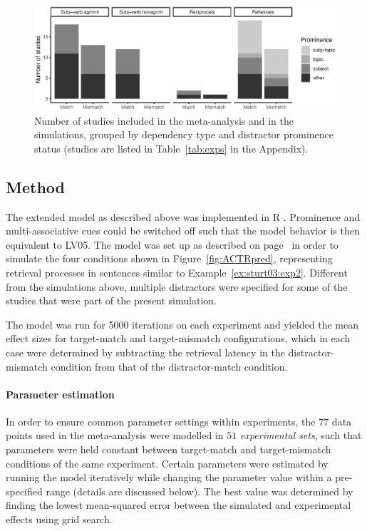 \documentclass{cambridge7A}\usepackage[]{graphicx}\usepackage[]{color}
\newenvironment{knitrout}{}{} %
\newcommand{\R}{\textsf{R}}
\begin{document}
\begin{figure}[htbp]
\centering
\begin{knitrout}
\color{fgcolor}

{\centering \includegraphics[width=\textwidth]{figures/fig-datsumfig-1} 

}



\end{knitrout}
\caption{Number of studies included in the \cite{JaegerEngelmannVasishth2017} meta-analysis and in the simulations, grouped by dependency type and distractor prominence status (studies are listed in Table~\ref{tab:exps} in the Appendix).}
\label{fig:datasummary}
\end{figure}

\subsection{Method}

The extended model as described above was implemented in \R{} \citep{R2016}. Prominence and multi-associative cues could be switched off such that the model behavior is then equivalent to LV05.
The model was set up as described on page~\pageref{sec:generalmethods} in order to simulate the four conditions shown in Figure~\ref{fig:ACTRpred}, representing retrieval processes in sentences similar to Example~\ref{ex:sturt03:exp2}. 
Different from the simulations above, multiple distractors were specified for some of the studies that were part of the present simulation. 

The model was run for 5000 iterations on each experiment and yielded the mean effect sizes for target-match and target-mismatch configurations, which in each case were determined by subtracting the retrieval latency in the distractor-mismatch condition from that of the distractor-match condition.


\paragraph{Parameter estimation}
In order to ensure common parameter settings within experiments, the $77$ data points used in the meta-analysis were modelled in $51$ \emph{experimental sets}, such that parameters were held constant between target-match and target-mismatch conditions of the same experiment. Certain parameters were estimated by running the model iteratively while changing the parameter value within a pre-specified range (details are discussed below). 
The best value was determined by finding the lowest mean-squared error between the simulated and experimental effects using grid search.
\end{document}
